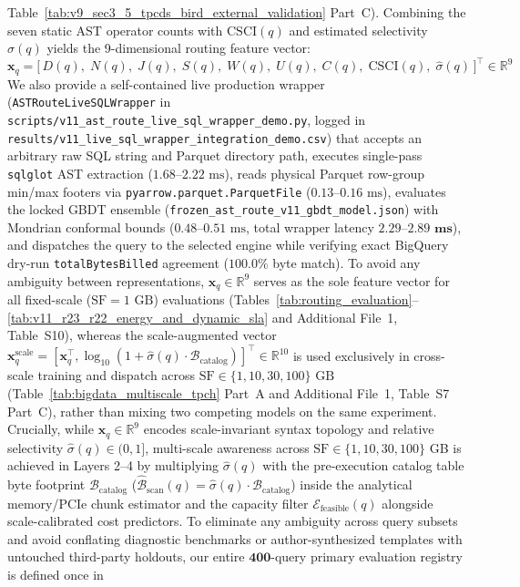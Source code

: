 \documentclass[10pt,a4paper]{article}
\begin{document}
Table~\ref{tab:v9_sec3_5_tpcds_bird_external_validation} Part~C). Combining the seven static AST operator counts with $\text{CSCI}(q)$ and estimated selectivity $\hat{\sigma}(q)$ yields the 9-dimensional routing feature vector:
\begin{equation}
    \mathbf{x}_q = \big[\, D(q),\; N(q),\; J(q),\; S(q),\; W(q),\; U(q),\; C(q),\; \text{CSCI}(q),\; \hat{\sigma}(q) \,\big]^{\top} \in \mathbb{R}^{9}
\end{equation}
 We also provide a self-contained live production wrapper (\texttt{ASTRouteLiveSQLWrapper} in \texttt{scripts/\allowbreak{}v11\_\allowbreak{}ast\_\allowbreak{}route\_\allowbreak{}live\_\allowbreak{}sql\_\allowbreak{}wrapper\_\allowbreak{}demo.py}, logged in \texttt{results/\allowbreak{}v11\_\allowbreak{}live\_\allowbreak{}sql\_\allowbreak{}wrapper\_\allowbreak{}integration\_\allowbreak{}demo.csv}) that accepts an arbitrary raw SQL string and Parquet directory path, executes single-pass \texttt{sqlglot} AST extraction ($1.68\text{--}2.22\text{ ms}$), reads physical Parquet row-group min/max footers via \texttt{pyarrow.parquet.ParquetFile} ($0.13\text{--}0.16\text{ ms}$), evaluates the locked GBDT ensemble (\texttt{frozen\_\allowbreak{}ast\_\allowbreak{}route\_\allowbreak{}v11\_\allowbreak{}gbdt\_\allowbreak{}model.json}) with Mondrian conformal bounds ($0.48\text{--}0.51\text{ ms}$, total wrapper latency $\mathbf{2.29\text{--}2.89\text{ ms}}$), and dispatches the query to the selected engine while verifying exact BigQuery dry-run \texttt{totalBytesBilled} agreement ($100.0\%$ byte match). To avoid any ambiguity between representations, $\mathbf{x}_q \in \mathbb{R}^{9}$ serves as the sole feature vector for all fixed-scale ($\text{SF}=1\text{ GB}$) evaluations (Tables~\ref{tab:routing_evaluation}--\ref{tab:v11_r23_r22_energy_and_dynamic_sla} and Additional File~1, Table~S10), whereas the scale-augmented vector $\mathbf{x}_q^{\text{scale}} = [\mathbf{x}_q^{\top}, \log_{10}(1+\hat{\sigma}(q)\cdot\mathcal{B}_{\text{catalog}})]^{\top} \in \mathbb{R}^{10}$ is used exclusively in cross-scale training and dispatch across $\text{SF}\in\{1,10,30,100\}\text{ GB}$ (Table~\ref{tab:bigdata_multiscale_tpch} Part~A and Additional File~1, Table~S7 Part~C), rather than mixing two competing models on the same experiment. Crucially, while $\mathbf{x}_q \in \mathbb{R}^9$ encodes scale-invariant syntax topology and relative selectivity $\hat{\sigma}(q) \in (0,1]$, multi-scale awareness across $\text{SF} \in \{1, 10, 30, 100\}$ GB is achieved in Layers 2--4 by multiplying $\hat{\sigma}(q)$ with the pre-execution catalog table byte footprint $\mathcal{B}_{\text{catalog}}$ ($\hat{\mathcal{B}}_{\text{scan}}(q) = \hat{\sigma}(q)\cdot \mathcal{B}_{\text{catalog}}$) inside the analytical memory/PCIe chunk estimator and the capacity filter $\mathcal{E}_{\text{feasible}}(q)$ alongside scale-calibrated cost predictors. To eliminate any ambiguity across query subsets and avoid conflating diagnostic benchmarks or author-synthesized templates with untouched third-party holdouts, our entire $\mathbf{400}$-query primary evaluation registry is defined once in 
\end{document}
